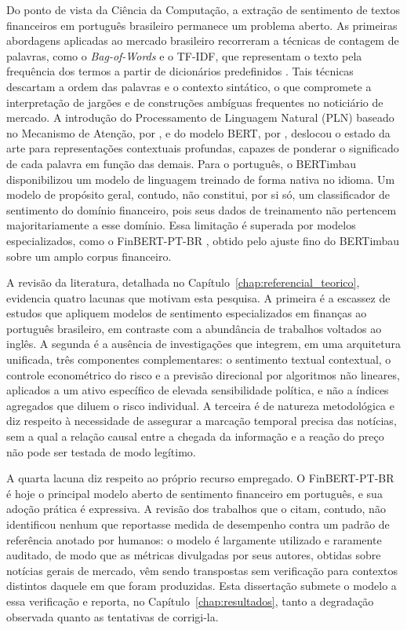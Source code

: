 Do ponto de vista da Ciência da Computação, a extração de sentimento de textos financeiros em português brasileiro permanece um problema aberto. As primeiras abordagens aplicadas ao mercado brasileiro recorreram a técnicas de contagem de palavras, como o \textit{Bag-of-Words} e o TF-IDF, que representam o texto pela frequência dos termos a partir de dicionários predefinidos \cite{nizer_metodo_2011}. Tais técnicas descartam a ordem das palavras e o contexto sintático, o que compromete a interpretação de jargões e de construções ambíguas frequentes no noticiário de mercado. A introdução do Processamento de Linguagem Natural (PLN) baseado no Mecanismo de Atenção, por , e do modelo BERT, por , deslocou o estado da arte para representações contextuais profundas, capazes de ponderar o significado de cada palavra em função das demais. Para o português, o BERTimbau \cite{souza_bertimbau_2020} disponibilizou um modelo de linguagem treinado de forma nativa no idioma. Um modelo de propósito geral, contudo, não constitui, por si só, um classificador de sentimento do domínio financeiro, pois seus dados de treinamento não pertencem majoritariamente a esse domínio. Essa limitação é superada por modelos especializados, como o FinBERT-PT-BR \cite{santos_finbert_2023}, obtido pelo ajuste fino do BERTimbau sobre um amplo corpus financeiro.

A revisão da literatura, detalhada no Capítulo~\ref{chap:referencial_teorico}, evidencia quatro lacunas que motivam esta pesquisa. A primeira é a escassez de estudos que apliquem modelos de sentimento especializados em finanças ao português brasileiro, em contraste com a abundância de trabalhos voltados ao inglês. A segunda é a ausência de investigações que integrem, em uma arquitetura unificada, três componentes complementares: o sentimento textual contextual, o controle econométrico do risco e a previsão direcional por algoritmos não lineares, aplicados a um ativo específico de elevada sensibilidade política, e não a índices agregados que diluem o risco individual. A terceira é de natureza metodológica e diz respeito à necessidade de assegurar a marcação temporal precisa das notícias, sem a qual a relação causal entre a chegada da informação e a reação do preço não pode ser testada de modo legítimo.

A quarta lacuna diz respeito ao próprio recurso empregado. O FinBERT-PT-BR é hoje o principal modelo aberto de sentimento financeiro em português, e sua adoção prática é expressiva. A revisão dos trabalhos que o citam, contudo, não identificou nenhum que reportasse medida de desempenho contra um padrão de referência anotado por humanos: o modelo é largamente utilizado e raramente auditado, de modo que as métricas divulgadas por seus autores, obtidas sobre notícias gerais de mercado, vêm sendo transpostas sem verificação para contextos distintos daquele em que foram produzidas. Esta dissertação submete o modelo a essa verificação e reporta, no Capítulo~\ref{chap:resultados}, tanto a degradação observada quanto as tentativas de corrigi-la.

